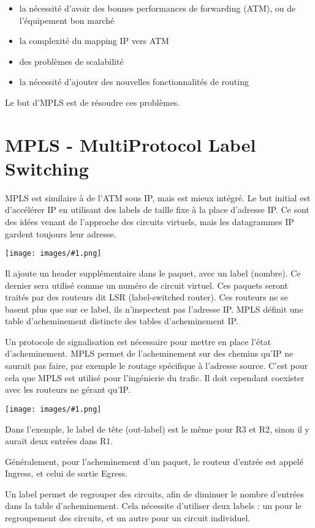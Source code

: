 \documentclass[10pt,a4paper]{report}
\newcommand{\dessin}[1]{\begin{center}\texttt{[image: images/\#1.png]}\end{center}}
\newcommand{\dessinS}[2]{\begin{center}\texttt{[image: images/\#1.png]}\end{center}}
\begin{document}
			\begin{itemize}
				\item la nécessité d'avoir des bonnes performances de forwarding (ATM), ou de l'équipement bon marché
				\item la complexité du mapping IP vers ATM
				\item des problèmes de scalabilité
				\item la nécessité d'ajouter des nouvelles fonctionnalités de routing
			\end{itemize}
			
			Le but d'MPLS est de résoudre ces problèmes.
			
	
	\section{MPLS - MultiProtocol Label Switching}
	
	MPLS est similaire à de l'ATM sous IP, mais est mieux intégré. Le but initial est d'accélérer IP en utilisant des labels de taille fixe à la place d'adresse IP. Ce sont des idées venant de l'approche des circuits virtuels, mais les datagrammes IP gardent toujours leur adresse.
	
	\dessinS{18}{.65}
	
	Il ajoute un header supplémentaire dans le paquet, avec un label (nombre). Ce dernier sera utilisé comme un numéro de circuit virtuel. Ces paquets seront traités par des routeurs dit LSR (label-switched router). Ces routeurs ne se basent plus que sur ce label, ils n'inspectent pas l'adresse IP. MPLS définit une table d'acheminement distincte des tables d'acheminement IP.
	
	Un protocole de signalisation est nécessaire pour mettre en place l'état d'acheminement. MPLS permet de l'acheminement sur des chemins qu'IP ne saurait pas faire, par exemple le routage spécifique à l'adresse source. C'est pour cela que MPLS est utilisé pour l'ingénierie du trafic. Il doit cependant coexister avec les routeurs ne gérant qu'IP.
	
	\dessin{19}
	
	Dans l'exemple, le label de tête (out-label) est le même pour R3 et R2, sinon il y aurait deux entrées dans R1.
	
	Généralement, pour l'acheminement d'un paquet, le routeur d'entrée est appelé Ingress, et celui de sortie Egress.
	
	Un label permet de regrouper des circuits, afin de diminuer le nombre d'entrées dans la table d'acheminement. Cela nécessite d'utiliser deux labels : un pour le regroupement des circuits, et un autre pour un circuit individuel.
	
\end{document}
